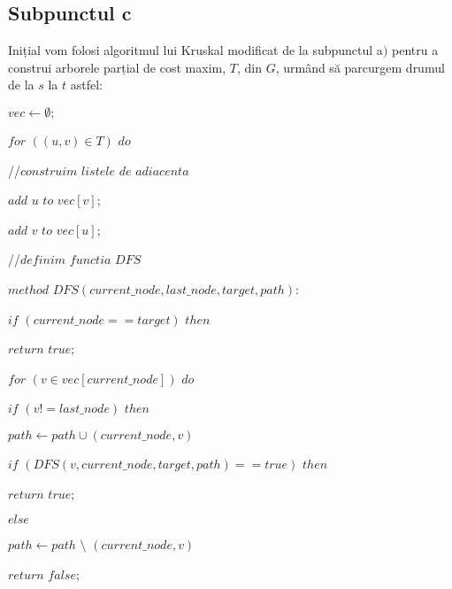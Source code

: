 \documentclass{article}
\begin{document}
{{\subsection*{\fontsize{16}{30}\selectfont Subpunctul c}
{\fontsize{14}{16}\selectfont Inițial vom folosi algoritmul lui Kruskal modificat de la subpunctul a$)$ pentru a construi arborele parțial de cost maxim, $T$, din $G$, urmând să parcurgem drumul de la $s$ la $t$ astfel:
    \\
    \par $vec \leftarrow \emptyset;$ 
    \par $for$  $((u,v)\in T)$ $do$
    \par \hspace*{1cm} //$construim$  $listele$  $de$  $adiacenta$
    \par \hspace*{1cm} $add$  $u$  $to$  $vec[v];$
    \par \hspace*{1cm} $add$  $v$  $to$  $vec[u];$
    \\
    \par //$definim$  $functia$  $DFS$
    \par $method$ $DFS(current\_ node, last\_node, target, path):$
    \par \hspace*{1cm} $if$ $(current\_node == target)$ $then$
    \par \hspace*{1.5cm} $return$  $true;$
    \par \hspace*{1cm}$for$  $(v \in vec[current\_node])$  $do$
    \par \hspace*{1.5cm} $if$ $(v != last\_node)$  $then$
    \par \hspace*{2cm} $path \leftarrow path \cup (current\_node, v)$
    \par \hspace*{2cm} $if$  $(DFS(v, current\_node, target, path) == true)$ $then$
    \par \hspace*{2.5cm} $return$ $true;$ 
    \par \hspace*{2cm} $else$
    \par \hspace*{2.5cm} $path \leftarrow path$ $\setminus$ $(current\_node, v)$
    \par \hspace*{1cm} $return$ $false;$
}}}
\end{document}
